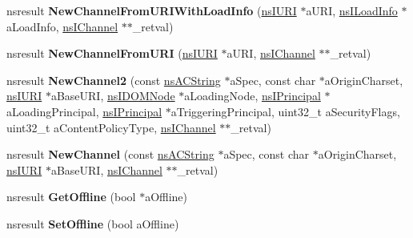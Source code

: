 \begin{DoxyCompactItemize}
nsresult {\bfseries New\+Channel\+From\+U\+R\+I\+With\+Load\+Info} (\hyperlink{interfacens_i_u_r_i}{ns\+I\+U\+RI} $\ast$a\+U\+RI, \hyperlink{interfacens_i_supports}{ns\+I\+Load\+Info} $\ast$a\+Load\+Info, \hyperlink{interfacens_i_channel}{ns\+I\+Channel} $\ast$$\ast$\+\_\+retval)
\item 
\mbox{\label{interfacens_i_i_o_service_aa7989ee4cca069f101b65ae3d8e0125b}} 
nsresult {\bfseries New\+Channel\+From\+U\+RI} (\hyperlink{interfacens_i_u_r_i}{ns\+I\+U\+RI} $\ast$a\+U\+RI, \hyperlink{interfacens_i_channel}{ns\+I\+Channel} $\ast$$\ast$\+\_\+retval)
\item 
\mbox{\label{interfacens_i_i_o_service_a47f095510829545ffd96dd08484f2c26}} 
nsresult {\bfseries New\+Channel2} (const \hyperlink{structns_c_string_container}{ns\+A\+C\+String} $\ast$a\+Spec, const char $\ast$a\+Origin\+Charset, \hyperlink{interfacens_i_u_r_i}{ns\+I\+U\+RI} $\ast$a\+Base\+U\+RI, \hyperlink{interfacens_i_d_o_m_node}{ns\+I\+D\+O\+M\+Node} $\ast$a\+Loading\+Node, \hyperlink{interfacens_i_supports}{ns\+I\+Principal} $\ast$a\+Loading\+Principal, \hyperlink{interfacens_i_supports}{ns\+I\+Principal} $\ast$a\+Triggering\+Principal, uint32\+\_\+t a\+Security\+Flags, uint32\+\_\+t a\+Content\+Policy\+Type, \hyperlink{interfacens_i_channel}{ns\+I\+Channel} $\ast$$\ast$\+\_\+retval)
\item 
\mbox{\label{interfacens_i_i_o_service_a76d95cea72c550d1932f09121b9e2524}} 
nsresult {\bfseries New\+Channel} (const \hyperlink{structns_c_string_container}{ns\+A\+C\+String} $\ast$a\+Spec, const char $\ast$a\+Origin\+Charset, \hyperlink{interfacens_i_u_r_i}{ns\+I\+U\+RI} $\ast$a\+Base\+U\+RI, \hyperlink{interfacens_i_channel}{ns\+I\+Channel} $\ast$$\ast$\+\_\+retval)
\item 
\mbox{\label{interfacens_i_i_o_service_ae3eb4ef1c03823968b27d222bc2e79b1}} 
nsresult {\bfseries Get\+Offline} (bool $\ast$a\+Offline)
\item 
\mbox{\label{interfacens_i_i_o_service_af8772194ea03b4eeb839cddfaffe5d53}} 
nsresult {\bfseries Set\+Offline} (bool a\+Offline)
\item 
\mbox{\label{interfacens_i_i_o_service_a772129af226289c826e5634ddc173c0f}} 

\end{DoxyCompactItemize}

